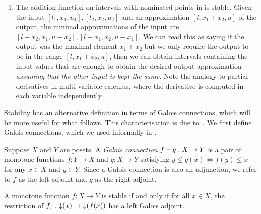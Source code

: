 \begin{example}
\begin{enumerate}
  \item The addition function on intervals with nominated points in
     is stable. Given the input
    $[l_1,x_1,u_1], [l_2,x_2,u_2]$ and an approximation
    $[l,x_1+x_2,u]$ of the output, the minimal approximations of the
    input are $[l-x_2,x_1,u-x_2], [l-x_1,x_2,u-x_1]$. We can read this
    as saying if the output was the maximal element $x_1+x_2$ but we
    only require the output to be in the range $[l,x_1+x_2,u]$, then
    we can obtain intervals containing the input values that are
    enough to obtain the desired output approximation \emph{assuming
      that the other input is kept the same}. Note the analogy to
    partial derivatives in multi-variable calculus, where the
    derivative is computed in each variable independently.
  \end{enumerate}
\end{example}


Stability has an alternative definition in terms of Galois
connections, which will be more useful for what follows. This
characterisation is due to~\citet{taylor99}. We first define Galois
connections, which we used informally in .

\begin{definition}
  \label{def:galois-connection}
  Suppose $X$ and $Y$ are posets. A \emph{Galois connection} $f \dashv g: X \to Y$ is a pair of monotone functions $f: Y \to X$ and $g: X \to Y$ satisfying $y \leq g(x) \iff f(y) \leq x$ for any $x \in X$ and $y \in Y$. Since a Galois connection is also an adjunction, we refer to $f$ as the left adjoint and $g$ as the right adjoint.
\end{definition}

\begin{lemma}
  A monotone function $f : X \to Y$ is stable if and only if for all
  $x \in X$, the restriction of $f_x : \mathop{\downarrow}(x) \to \mathop{\downarrow}(f(x))$
  has a left Galois adjoint.
\end{lemma}

